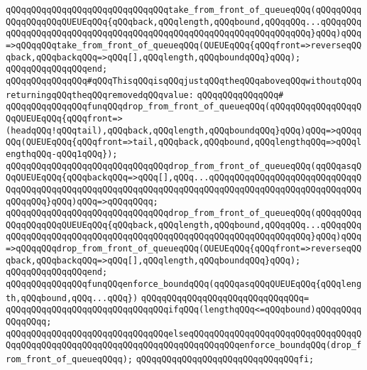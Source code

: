 \verb|qQQqqQQqqQQqqQQqqQQqqQQqqQQqqQQqtake_from_front_of_queueqQQq(qQQqqQQqqQQqqQQqqQQqQUEUEqQQq{qQQqback,qQQqlength,qQQqbound,qQQqqQQq...qQQqqQQqqQQqqQQqqQQqqQQqqQQqqQQqqQQqqQQqqQQqqQQqqQQqqQQqqQQqqQQqqQQq}qQQq)qQQq=>qQQqqQQqtake_from_front_of_queueqQQq(QUEUEqQQq{qQQqfront=>reverseqQQqback,qQQqbackqQQq=>qQQq[],qQQqlength,qQQqboundqQQq}qQQq);|\newline
\verb|qQQqqQQqqQQqqQQqend;|\newline
\newline
\verb|qQQqqQQqqQQqqQQq#qQQqThisqQQqisqQQqjustqQQqtheqQQqaboveqQQqwithoutqQQqreturningqQQqtheqQQqremovedqQQqvalue:|\newline
\verb|qQQqqQQqqQQqqQQq#|\newline
\verb|qQQqqQQqqQQqqQQqfunqQQqdrop_from_front_of_queueqQQq(qQQqqQQqqQQqqQQqqQQqQUEUEqQQq{qQQqfront=>(headqQQq!qQQqtail),qQQqback,qQQqlength,qQQqboundqQQq}qQQq)qQQq=>qQQqqQQq(QUEUEqQQq{qQQqfront=>tail,qQQqback,qQQqbound,qQQqlengthqQQq=>qQQqlengthqQQq-qQQq1qQQq});|\newline
\verb|qQQqqQQqqQQqqQQqqQQqqQQqqQQqqQQqdrop_from_front_of_queueqQQq(qqQQqasqQQqQUEUEqQQq{qQQqbackqQQq=>qQQq[],qQQq...qQQqqQQqqQQqqQQqqQQqqQQqqQQqqQQqqQQqqQQqqQQqqQQqqQQqqQQqqQQqqQQqqQQqqQQqqQQqqQQqqQQqqQQqqQQqqQQqqQQqqQQqqQQq}qQQq)qQQq=>qQQqqQQqq;|\newline
\verb|qQQqqQQqqQQqqQQqqQQqqQQqqQQqqQQqdrop_from_front_of_queueqQQq(qQQqqQQqqQQqqQQqqQQqQUEUEqQQq{qQQqback,qQQqlength,qQQqbound,qQQqqQQq...qQQqqQQqqQQqqQQqqQQqqQQqqQQqqQQqqQQqqQQqqQQqqQQqqQQqqQQqqQQqqQQqqQQq}qQQq)qQQq=>qQQqqQQqdrop_from_front_of_queueqQQq(QUEUEqQQq{qQQqfront=>reverseqQQqback,qQQqbackqQQq=>qQQq[],qQQqlength,qQQqboundqQQq}qQQq);|\newline
\verb|qQQqqQQqqQQqqQQqend;|\newline
\newline
\newline
\newline
\verb|qQQqqQQqqQQqqQQqfunqQQqenforce_boundqQQq(qqQQqasqQQqQUEUEqQQq{qQQqlength,qQQqbound,qQQq...qQQq})|\newline
\verb|qQQqqQQqqQQqqQQqqQQqqQQqqQQqqQQq=|\newline
\verb|qQQqqQQqqQQqqQQqqQQqqQQqqQQqqQQqifqQQq(lengthqQQq<=qQQqbound)qQQqqQQqqQQqqQQqq;|\newline
\verb|qQQqqQQqqQQqqQQqqQQqqQQqqQQqqQQqelseqQQqqQQqqQQqqQQqqQQqqQQqqQQqqQQqqQQqqQQqqQQqqQQqqQQqqQQqqQQqqQQqqQQqqQQqqQQqqQQqenforce_boundqQQq(drop_from_front_of_queueqQQqq);|\newline
\verb|qQQqqQQqqQQqqQQqqQQqqQQqqQQqqQQqfi;|\newline
